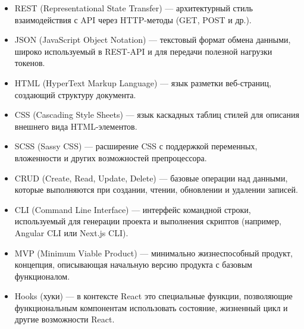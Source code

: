 \begin{itemize}
  \item REST (Representational State Transfer) — архитектурный стиль взаимодействия с API через HTTP-методы (GET, POST и др.).
  \item JSON (JavaScript Object Notation) — текстовый формат обмена данными, широко используемый в REST-API и для передачи полезной нагрузки токенов.
  \item HTML (HyperText Markup Language) — язык разметки веб-страниц, создающий структуру документа.
  \item CSS (Cascading Style Sheets) — язык каскадных таблиц стилей для описания внешнего вида HTML-элементов.
  \item SCSS (Sassy CSS) — расширение CSS с поддержкой переменных, вложенности и других возможностей препроцессора.
  \item CRUD (Create, Read, Update, Delete) — базовые операции над данными, которые выполняются при создании, чтении, обновлении и удалении записей.
  \item CLI (Command Line Interface) — интерфейс командной строки, используемый для генерации проекта и выполнения скриптов (например, Angular CLI или Next.js CLI).
  \item MVP (Minimum Viable Product) — минимально жизнеспособный продукт, концепция, описывающая начальную версию продукта с базовым функционалом.
  \item Hooks (хуки) — в контексте React это специальные функции, позволяющие функциональным компонентам использовать состояние, жизненный цикл и другие возможности React.
\end{itemize}